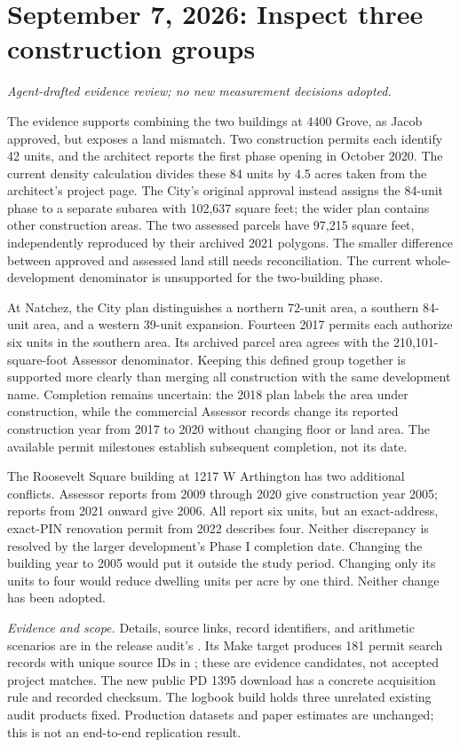 \section*{September 7, 2026: Inspect three construction groups}
\textit{Agent-drafted evidence review; no new measurement decisions adopted.}

The evidence supports combining the two buildings at 4400 Grove, as Jacob
approved, but exposes a land mismatch. Two construction permits each identify
42 units, and the architect reports the first phase opening in October 2020.
The current density calculation divides these 84 units by 4.5 acres taken from
the architect's project page. The City's original approval instead assigns the
84-unit phase to a separate subarea with 102,637 square feet; the wider plan
contains other construction areas. The two assessed parcels have 97,215 square
feet, independently reproduced by their archived 2021 polygons. The smaller
difference between approved and assessed land still needs reconciliation. The
current whole-development denominator is unsupported for the two-building phase.

At Natchez, the City plan distinguishes a northern 72-unit area, a southern
84-unit area, and a western 39-unit expansion. Fourteen 2017 permits each
authorize six units in the southern area. Its archived parcel area agrees with
the 210,101-square-foot Assessor denominator. Keeping this defined group together
is supported more clearly than merging all construction with the same
development name. Completion remains uncertain: the 2018 plan labels the area
under construction, while the commercial Assessor records change its reported
construction year from 2017 to 2020 without changing floor or land area. The
available permit milestones establish subsequent completion, not its date.

The Roosevelt Square building at 1217 W Arthington has two additional conflicts.
Assessor reports from 2009 through 2020 give construction year 2005; reports from
2021 onward give 2006. All report six units, but an exact-address, exact-PIN
renovation permit from 2022 describes four. Neither discrepancy is resolved by
the larger development's Phase I completion date. Changing the building year to
2005 would put it outside the study period. Changing only its units to four would
reduce dwelling units per acre by one third. Neither change has been adopted.

\small
\textit{Evidence and scope.} Details, source links, record identifiers, and
arithmetic scenarios are in the release audit's
. Its Make target produces 181 permit search
records with unique source IDs in ; these are
evidence candidates, not accepted project matches. The new public PD 1395 download
has a concrete acquisition rule and recorded checksum. The logbook build holds
three unrelated existing audit products fixed. Production datasets and paper
estimates are unchanged; this is not an end-to-end replication result.
\normalsize
